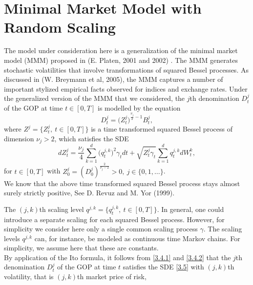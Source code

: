\documentclass[a4 paper, 12pt]{report}
\theoremstyle{plain}
\begin{document}
\section{Minimal Market Model with Random Scaling}
\noindent
\par The model under consideration here is a generalization of the minimal market model (MMM) proposed in %
(E. Platen, 2001 and 2002) . The MMM generates
stochastic volatilities that involve transformations of squared Bessel processes.
As discussed in (W. Breymann et al, 2005), the MMM captures a number of
important stylized empirical facts observed for indices and exchange rates.
Under the generalized version of the MMM that we considered, the $j$th denomination $D_t^j$ of the GOP at time $t \in [0, T ]$ is modelled by the equation
\begin{equation}\label{3.4.1}
D_t^j = \bigg(Z_t^j\bigg)^{\frac{\nu_j}{2}-1}B_t^j,
\end{equation}
where $Z^j = \{Z_t^j,~t\in[0,T]\}$ is a time transformed squared Bessel process of dimension $\nu_j>2$, which satisfies the SDE
\begin{equation}\label{3.4.2}
dZ_t^j = \frac{\nu_j}{4}\sum_{k = 1}^d\bigg(q_t^{j,k}\bigg)^2\gamma_tdt+\sqrt{Z_t^j\gamma_t}\sum_{k = 1}^dq_t^{j,k}dW_t^k,
\end{equation}
for $t\in[0,T]$ with $Z_0^j = (D_0^j)^{\frac{2}{\nu_j-2}}>0,~j\in\{0,1,\ldots\}$.\\
We know that the above time transformed squared Bessel process stays almost
surely strictly positive, See D. Revuz and M. Yor (1999).\\
\par The $(j,k)$th scaling level $q^{j,k} = \{q_t^{j,k},~t\in[0,T]\}$. In general, one could introduce a separate scaling for each squared Bessel process. However, for simplicity we consider  here only a single common scaling process $\gamma$. The scaling levels $q^{j,k}$ can, for instance, be modeled as continuous time Markov chains. For simplicity, we assume here that these are constants. \\

By application of the Ito formula, it follows from \eqref{3.4.1} and \eqref{3.4.2} that the $j$th
denomination $D^j_t$ of the GOP at time $t$ satisfies the SDE \eqref{3.5} with $(j, k)$th
volatility, that is $(j,k)$th market price of risk,
\end{document}
